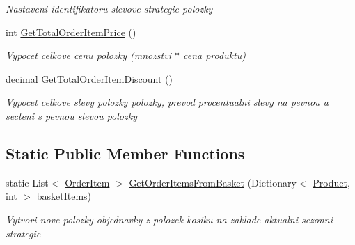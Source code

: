 \begin{DoxyCompactItemize}
\begin{DoxyCompactList}\small\item\em Nastaveni identifikatoru slevove strategie polozky \end{DoxyCompactList}\item 
int \mbox{\hyperlink{class_eshop_1_1_order_item_a68867e76d65c7d59f440ac1f15bf755b}{Get\+Total\+Order\+Item\+Price}} ()
\begin{DoxyCompactList}\small\item\em Vypocet celkove cenu polozky (mnozstvi $\ast$ cena produktu) \end{DoxyCompactList}\item 
decimal \mbox{\hyperlink{class_eshop_1_1_order_item_ad6e18bac06d092157318b0d650f7abe8}{Get\+Total\+Order\+Item\+Discount}} ()
\begin{DoxyCompactList}\small\item\em Vypocet celkove slevy polozky polozky, prevod procentualni slevy na pevnou a secteni s pevnou slevou polozky \end{DoxyCompactList}\end{DoxyCompactItemize}
\subsection*{Static Public Member Functions}
\begin{DoxyCompactItemize}
\item 
static List$<$ \mbox{\hyperlink{class_eshop_1_1_order_item}{Order\+Item}} $>$ \mbox{\hyperlink{class_eshop_1_1_order_item_a0b550553bf5e5fa18e52a18cd0970f9c}{Get\+Order\+Items\+From\+Basket}} (Dictionary$<$ \mbox{\hyperlink{class_eshop_1_1_product}{Product}}, int $>$ basket\+Items)
\begin{DoxyCompactList}\small\item\em Vytvori nove polozky objednavky z polozek kosiku na zaklade aktualni sezonni strategie \end{DoxyCompactList}\end{DoxyCompactItemize}
